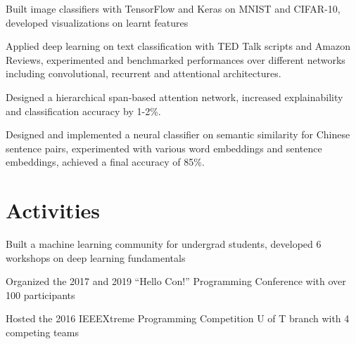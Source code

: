 \documentclass[]{deedy-resume-openfont}
\begin{document}
\begin{minipage}[t]{0.66\textwidth}
\sectionsep
{}
\begin{tightemize}
    \item Built image classifiers with TensorFlow and Keras on MNIST and CIFAR-10, developed visualizations on learnt features 
    \item Applied deep learning on text classification with TED Talk scripts and Amazon Reviews, experimented and benchmarked performances over different networks including convolutional, recurrent and attentional architectures.
    \item Designed a hierarchical span-based attention network, increased explainability and classification accuracy by 1-2\%.  
\end{tightemize}

\sectionsep
{}
\begin{tightemize}
    \item Designed and implemented a neural classifier on semantic similarity for Chinese sentence pairs, experimented with various word embeddings and sentence embeddings, achieved a final accuracy of 85\%.
\end{tightemize}



\section{Activities}

\sectionsep
{}
\begin{tightemize}
    \item Built a machine learning community for undergrad students, developed 6 workshops on deep learning fundamentals
\end{tightemize}
\sectionsep

\sectionsep
{}
\begin{tightemize}
    \item Organized the 2017 and 2019 “Hello Con!” Programming Conference with over 100 participants
    \item Hosted the 2016 IEEEXtreme Programming Competition U of T branch with 4 competing teams

\end{tightemize}
\sectionsep


\sectionsep
\end{minipage} 
\end{document}
